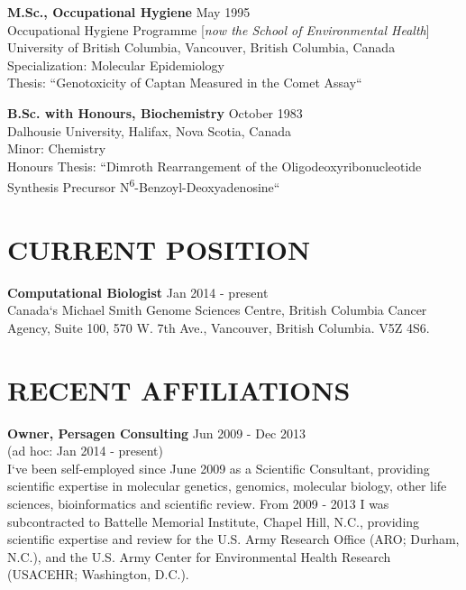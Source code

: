 \documentclass[margin]{res} %
\begin{document}
\begin{resume}
\textbf{M.Sc., Occupational Hygiene} \hfill May 1995\vspace{0.1 cm}\\
Occupational Hygiene Programme [\textit{now the School of Environmental Health}]\\
University of British Columbia, Vancouver, British Columbia, Canada\\
Specialization: Molecular Epidemiology\\
Thesis: ``Genotoxicity of Captan Measured in the Comet Assay``

\textbf{B.Sc. with Honours, Biochemistry} \hfill October 1983\vspace{0.1 cm}\\
Dalhousie University, Halifax, Nova Scotia, Canada\\
Minor: Chemistry\\
Honours Thesis: ``Dimroth Rearrangement of the Oligodeoxyribonucleotide Synthesis Precursor N\textsuperscript{6}-Benzoyl-Deoxyadenosine``


{\color{blue}\section{CURRENT POSITION}}

\textbf{Computational Biologist} \hfill Jan 2014 - present\vspace{0.1 cm}\\
Canada`s Michael Smith Genome Sciences Centre, British Columbia Cancer Agency, Suite 100, 570 W. 7th Ave., Vancouver, British Columbia.  V5Z 4S6.

 
{\color{blue}\section{RECENT AFFILIATIONS}}


\textbf{Owner, Persagen Consulting}
\hfill Jun 2009 - Dec 2013\\
\hphantom{1} \hfill (ad hoc: Jan 2014 - present)\vspace{0.1 cm}\\
I`ve been self-employed since June 2009 as a Scientific Consultant, providing scientific expertise in molecular genetics, genomics, molecular biology, other life sciences, bioinformatics and scientific review. From 2009 - 2013 I was subcontracted to Battelle Memorial Institute, Chapel Hill, N.C., providing scientific expertise and review for the U.S. Army Research Office (ARO; Durham, N.C.), and the U.S. Army Center for Environmental Health Research (USACEHR; Washington, D.C.).


\end{resume}
\end{document}
